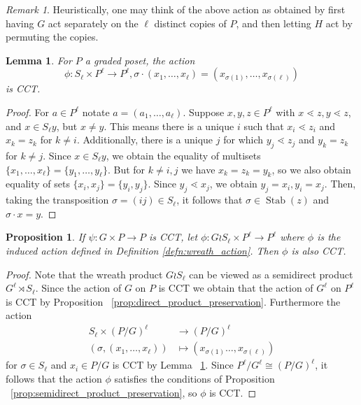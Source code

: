 \documentclass[smallextended, envcountsame, numbook]{svjour3}
\theoremstyle{plain}
\newtheorem{prop}[thm]{Proposition}
\newtheorem{lem}[thm]{Lemma}
\theoremstyle{definition}
\theoremstyle{remark}
\newtheorem{rmk}[thm]{Remark}
\numberwithin{equation}{section}
\newcommand\Stab{\operatorname{Stab}}
\begin{document}
\begin{rmk}
Heuristically, one may think of the above action as obtained by first having $G$ act separately on the $\ell$ distinct copies of $P$, and then letting $H$ act by permuting the copies.
\end{rmk}

\begin{lem}
\label{lem:symmetric_group_product_action}
For $P$ a graded poset, the action 
$$\phi\colon S_\ell \times P^\ell \rightarrow P^\ell,\sigma \cdot(x_1,\ldots, x_\ell) = (x_{\sigma(1)},\ldots, x_{\sigma(\ell)})$$
is CCT.
\end{lem}

\begin{proof}
For $a \in P^\ell$ notate $a = (a_1,\ldots, a_\ell)$. Suppose $x,y,z \in P^\ell$ with $x\lessdot z,y\lessdot z$, and $x \in S_\ell y$, but $x \neq y$. This means there is a unique $i$ such that $x_i \lessdot z_i$ and $x_k = z_k$ for $k \neq i$. Additionally, there is a unique $j$ for which $y_j \lessdot z_j$ and $y_k =z_k$ for $k \neq j$. Since $x \in S_\ell y$, we obtain the equality of multisets $\{x_1,\ldots, x_\ell\}=\{y_1,\ldots,y_\ell\}$. But for $k \neq i,j$ we have $x_k = z_k = y_k$, so we also obtain equality of sets $\{x_i,x_j\} = \{y_i,y_j\}$. Since $y_j \lessdot x_j$, we obtain $y_j = x_i,y_i = x_j$. Then, taking the transposition $\sigma  = (ij) \in S_\ell$, it follows that $\sigma \in \Stab(z)$ and $\sigma \cdot x = y$.
\end{proof}

\begin{prop}
\label{prop:wreath_preservation}
If $\psi\colon G\times P \rightarrow P$ is CCT, let $\phi\colon G\wr S_\ell \times P^\ell \rightarrow P^\ell$ where $\phi$ is the induced action defined in Definition \ref{defn:wreath_action}. Then $\phi$ is also CCT.
\end{prop}
\begin{proof}
Note that the wreath product $G \wr S_\ell$ can be viewed as a semidirect product $G^\ell \rtimes S_\ell$. Since the action of $G$ on $P$ is CCT we obtain that the action of $G^\ell$ on $P^\ell$ is CCT by Proposition ~\ref{prop:direct_product_preservation}.  Furthermore the action 
\begin{align*}
S_\ell \times (P/G)^\ell &\rightarrow (P/G)^\ell \\
	(\sigma ,(x_1,\ldots, x_\ell)) &\mapsto (x_{\sigma(1)}\ldots, x_{\sigma(\ell)})
\end{align*}
 for $\sigma \in S_\ell$ and $x_i \in P/G$ is CCT by Lemma ~\ref{lem:symmetric_group_product_action}.  Since $P^\ell/G^\ell \cong (P/G)^\ell$, it follows that the action $\phi$ satisfies the conditions of Proposition ~\ref{prop:semidirect_product_preservation}, so $\phi$ is CCT.
\end{proof}
\end{document}
